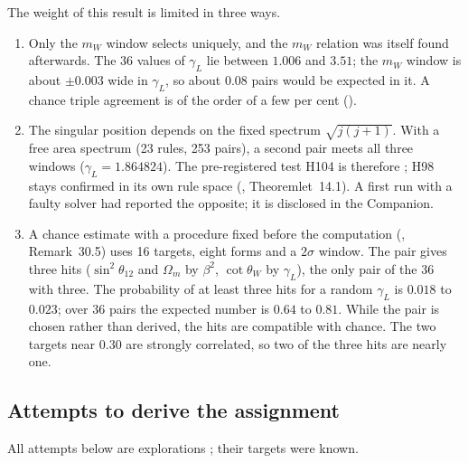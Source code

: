 The weight of this result is limited in three ways.
\begin{enumerate}
\item Only the $m_W$ window selects uniquely, and the $m_W$ relation was itself found afterwards.  The $36$ values of $\gamma_L$ lie between
$1.006$ and $3.51$; the $m_W$ window is about $\pm0.003$ wide in $\gamma_L$, so about $0.08$ pairs would be expected in it.  A chance triple
agreement is of the order of a few per cent ().
\item The singular position depends on the fixed spectrum $\sqrt{j(j+1)}$.  With a free area spectrum (23 rules, 253 pairs), a second pair meets
all three windows ($\gamma_L=1.864824$).  The pre-registered test H104 is therefore \Refuted; H98 stays confirmed in its own rule space
(, Theoremlet~14.1).  A first run with a faulty solver had reported the opposite; it is disclosed in the Companion.
\item A chance estimate with a procedure fixed before the computation (, Remark~30.5) uses 16 targets, eight forms and a $2\sigma$ window.
The pair gives three hits ($\sin^2\theta_{12}$ and $\Omega_m$ by $\beta^2$, $\cot\theta_W$ by $\gamma_L$), the only pair of the 36 with three.  The
probability of at least three hits for a random $\gamma_L$ is $0.018$ to $0.023$; over 36 pairs the expected number is $0.64$ to $0.81$.  While the pair
is chosen rather than derived, the hits are compatible with chance.  The two targets near $0.30$ are strongly correlated, so two of the three hits
are nearly one.
\end{enumerate}

\subsection{Attempts to derive the assignment}
\label{sec:beta-attempts}

All attempts below are explorations \Exploration; their targets were known.

